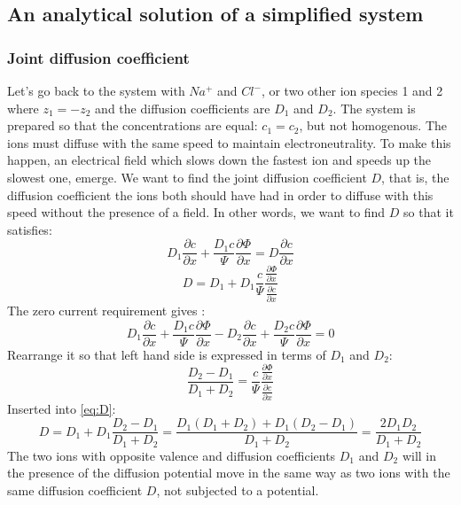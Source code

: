 \documentclass{article}
\begin{document}
\subsection{An analytical solution of a simplified system}
\subsubsection{Joint diffusion coefficient}\label{joint diffusion}
Let's go back to the system with $Na^+$ and $Cl^-$, or two other ion species 1 and 2 where $z_1 = -z_2$ and the diffusion coefficients are $D_1$ and $D_2$. The system is prepared so that the concentrations are equal: $c_1 = c_2$, but not homogenous. The ions must diffuse with the same speed to maintain electroneutrality. To make this happen, an electrical field which slows down the fastest ion and speeds up the slowest one, emerge.  We want to find the joint diffusion coefficient $D$, that is, the diffusion coefficient the ions both should have had in order to diffuse with this speed without the presence of a field. In other words, we want to find $D$ so that it satisfies:
\begin{equation}
D_1 \frac{\partial c}{\partial x} + \frac{D_1 c}{\Psi}\frac{\partial \Phi}{\partial x} = D\frac{\partial c}{\partial x}
\end{equation} 
\begin{equation}\label{eq:D}
D = D_1 + D_1 \frac{c}{\Psi}\frac{\frac{\partial \Phi}{\partial x}}{\frac{\partial c}{\partial x}}
\end{equation}
The zero current requirement gives :
\begin{equation}
D_1 \frac{\partial c}{\partial x} + \frac{D_1 c}{\Psi}\frac{\partial \Phi}{\partial x} - D_2 \frac{\partial c}{\partial x} + \frac{D_2 c}{\Psi}\frac{\partial \Phi}{\partial x} = 0
\end{equation}
Rearrange it so that left hand side is expressed in terms of $D_1$ and $D_2$:
\begin{equation}
\frac{D_2 - D_1}{D_1 + D_2} = \frac{c}{\Psi}\frac{\frac{\partial \Phi}{\partial x}}{\frac{\partial c}{\partial x}}
\end{equation}
Inserted into \ref{eq:D}: 
\begin{equation}
D = D_1 +D_1 \frac{D_2 - D_1}{D_1 + D_2} = \frac{D_1(D_1 + D_2)+D_1(D_2-D_1)}{D_1+D_2} = \frac{2D_1D_2}{D_1+D_2}
\end{equation}
The two ions with opposite valence and diffusion coefficients $D_1$ and $D_2$ will in the presence of the diffusion potential move in the same way as two ions with the same diffusion coefficient $D$, not subjected to a potential. 
\end{document}
